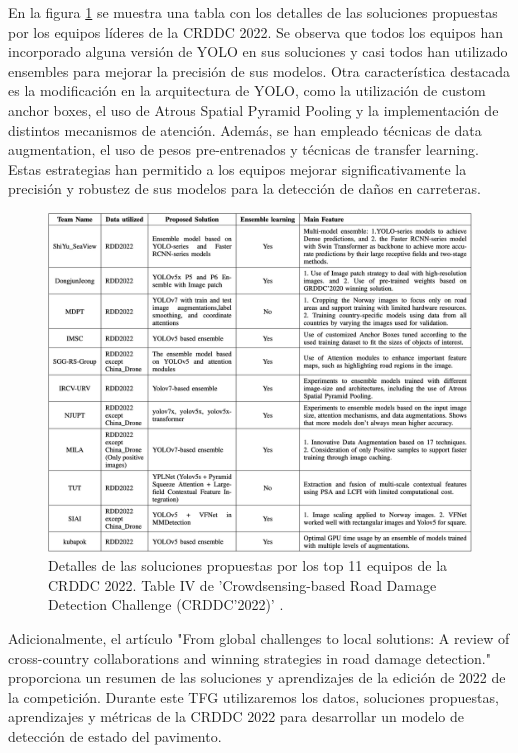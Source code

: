En la figura \ref{fig:CRDDC2022_detailed_solutions} se muestra una tabla con los detalles de las soluciones propuestas por los equipos líderes de la CRDDC 2022. Se observa que todos los equipos han incorporado alguna versión de YOLO en sus soluciones y casi todos han utilizado ensembles para mejorar la precisión de sus modelos. Otra característica destacada es la modificación en la arquitectura de YOLO, como la utilización de custom anchor boxes, el uso de Atrous Spatial Pyramid Pooling y la implementación de distintos mecanismos de atención. Además, se han empleado técnicas de data augmentation, el uso de pesos pre-entrenados y técnicas de transfer learning. Estas estrategias han permitido a los equipos mejorar significativamente la precisión y robustez de sus modelos para la detección de daños en carreteras.

\begin{figure}[H]
    \centering
    \includegraphics[width=1\textwidth]{../img/winner-solutions.png}
    \caption{Detalles de las soluciones propuestas por los top 11 equipos de la CRDDC 2022. Table IV de 'Crowdsensing-based Road Damage Detection Challenge (CRDDC’2022)' \cite{CRDDC2022_paper}.}
    \label{fig:CRDDC2022_detailed_solutions}
\end{figure}

Adicionalmente, el artículo "From global challenges to local solutions: A review of cross-country collaborations and winning strategies in road damage detection." \cite{CRDDC2022_review} proporciona un resumen de las soluciones y aprendizajes de la edición de 2022 de la competición. Durante este TFG utilizaremos los datos, soluciones propuestas, aprendizajes y métricas de la CRDDC 2022 para desarrollar un modelo de detección de estado del pavimento.

